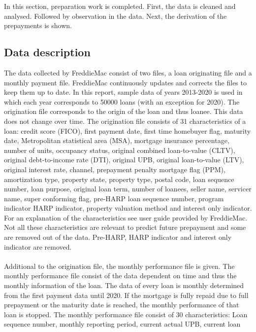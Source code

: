 In this section, preparation work is completed. First, the data is 
cleaned and analysed. Followed by observation in the data. Next, the 
derivation of the prepayments is shown.  

\subsection{Data description}
    The data collected by FreddieMac consist of two files, a loan 
    originating file and a monthly payment file. FreddieMac continuously 
    updates and corrects the files to keep them up to date. 
    In this report, sample data of years 2013-2020 is used in which 
    each year corresponds to 50000 loans (with an exception for 2020). 
    The origination file corresponds to the origin of the loan and thus 
    loanee. This data does not change over time. The origination file 
    consists of 31 characteristics of a loan: credit score (FICO), 
    first payment date, first time homebuyer flag, maturity date, 
    Metropolitan statistical area (MSA), mortgage insurance percentage, 
    number of units, occupancy status, original combined loan-to-value 
    (CLTV), original debt-to-income rate (DTI), original UPB, original 
    loan-to-value (LTV), original interest rate, channel, prepayment 
    penalty mortgage flag (PPM), amortization type, property state, 
    property type, postal code, loan sequence number, loan purpose, 
    original loan term, number of loanees, seller name, servicer name, 
    super conforming flag, pre-HARP loan sequence number, 
    program indicator HARP indicator, property valuation method 
    and interest only indicator. For an explanation of the 
    characteristics see user guide provided by FreddieMac. Not all 
    these characteristics are relevant to predict future prepayment and 
    some are removed out of the data. Pre-HARP, HARP indicator 
    and interest only indicator are removed.
    \\\\
    Additional to the origination file, the monthly performance 
    file is given. The monthly performance file consist of the data 
    dependent on time and thus the monthly information of the loan. 
    The data of every loan is monthly determined from the first payment 
    data until 2020. If the mortgage is fully repaid due to 
    full prepayment or the maturity date is reached, the monthly 
    performance of that loan is stopped. The monthly performance 
    file consist of 30 characteristics: Loan sequence number, 
    monthly reporting period, current actual UPB, current loan 
